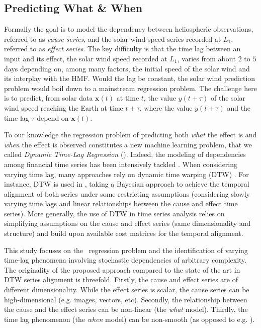 \subsection{Predicting What \& When}\label{sec:dtlrintro}
Formally the goal is to model the dependency between heliospheric observations, referred to as 
{\em cause series}, and the solar wind speed series recorded at $L_1$, referred to as 
{\em effect series}. The key difficulty is that the time lag between an input and its effect, the 
solar wind speed recorded at $L_1$, varies from about $2$ to $5$ days depending on, among many 
factors, the initial speed of the solar wind and its interplay with the HMF. Would the lag be 
constant, the solar wind prediction problem would boil down to a mainstream regression problem. The 
challenge here is to predict, from solar data $\mathbf{x}(t)$ at time $t$, the value $y(t+\tau)$ of the solar 
wind speed reaching the Earth at time $t+\tau$, where the value $y(t+\tau)$ and the time lag 
$\tau$ depend on $\mathbf{x}(t)$.

To our knowledge the regression problem of predicting both {\em what} the effect is and {\em when} 
the effect is observed constitutes a new machine learning problem, that we called 
{\em Dynamic Time-Lag Regression} (\XX). Indeed, the modeling of dependencies among financial time 
series has been intensively tackled \citep{ZHOU2006195}. When considering varying time lag, many 
approaches rely on dynamic time warping (DTW) \citep{SakoeShiba1978}. For instance, DTW is used in 
\citet{SignalDiffusion}, taking a Bayesian approach to achieve the temporal alignment of both 
series under some restricting assumptions (considering slowly varying time lags and linear 
relationships between the cause and effect time series). More generally, the use of DTW in time 
series analysis relies on simplifying assumptions on the cause and effect series 
(same dimensionality and structure) and build upon available cost matrices for the temporal 
alignment. 

This study focuses on the \XX\ regression problem and the identification of varying time-lag 
phenomena involving stochastic dependencies of arbitrary complexity. The originality of the 
proposed approach compared to the state of the art in DTW series alignment is threefold. Firstly, 
the cause and effect series are of different dimensionality. While the effect series is scalar, the 
cause series can be high-dimensional (e.g. images, vectors, etc). Secondly, the relationship 
between the cause and the effect series can be non-linear (the {\em what} model). Thirdly, the time 
lag phenomenon (the {\em when} model) can be non-smooth (as opposed to e.g. \citet{ZHOU2006195}).

